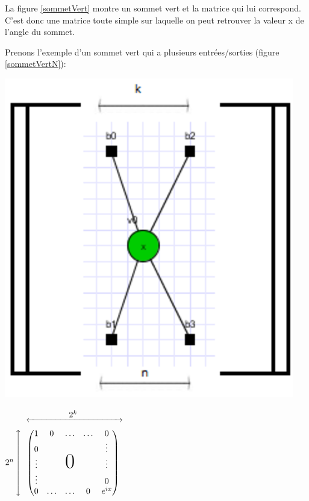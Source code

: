 \documentclass[a4paper,oneside]{book}
\begin{document}
%
%

La figure \ref{sommetVert} montre un sommet vert et la matrice qui lui correspond. C'est donc une matrice toute simple sur laquelle on peut retrouver la valeur x de l'angle du sommet.

Prenons l'exemple d'un sommet vert qui a plusieurs entrées/sorties (figure \ref{sommetVertN}):

\begin{center}
\begin{minipage}[c]{0.25\textwidth}
\includegraphics[scale=0.6]{IMG/sommetVertN.eps}
\end{minipage}
\hspace{1cm}
\begin{minipage}[c]{0.25\textwidth}
$
2^n
\mymatrix{\begin{pmatrix}
1 &0& \hdots & \hdots & 0 \\
0 &   &   &   & \vdots \\
\vdots  &   & \text{\Huge0}  &   & \vdots \\
\vdots  &   &   &   & 0 \\
0 & \hdots & \hdots & 0 & e^{ix} \\
\end{pmatrix}}
$
\end{minipage}
\label{sommetVertN}
\end{center}
\end{document}
